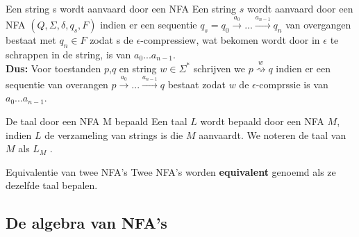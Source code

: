 \newpage

\begin{theo}{Een string s wordt aanvaard door een NFA}
    Een string $s$ wordt aanvaard door een NFA $(Q,\Sigma, \delta, q_s, F)$ indien
    er een sequentie $q_s = q_0 \overset{a_0}{\to} ... \overset{a_{n-1}}{\to} q_n$
    van overgangen bestaat met $q_n \in F$ zodat s de $\epsilon$-compressiew, wat bekomen wordt door
    in $\epsilon$ te schrappen in de string, is van $a_0...a_{n-1}$. \\
    
    \noindent \textbf{Dus:} Voor toestanden $p$,$q$ en string $w \in \Sigma^*$ schrijven we $p \overset{w}{\rightsquigarrow} q$
    indien er een sequentie van overangen $ p \overset{a_0}{\to} ... \overset{a_{n-1}}{\to} q$ bestaat zodat $w$
    de $\epsilon$-comprssie is van $a_0...a_{n-1}$.
\end{theo}

\begin{theo}{De taal door een NFA M bepaald}
    Een taal $L$ wordt bepaald door een NFA $M$, indien $L$ de verzameling van strings is die $M$ aanvaardt.
    We noteren de taal van $M$ als $L_M$ .
\end{theo}

\begin{theo}{Equivalentie van twee NFA's}
    Twee NFA's worden \textbf{equivalent} genoemd als ze dezelfde taal bepalen.
\end{theo}

\subsection{De algebra van NFA's}

\vspace{0.5cm}

